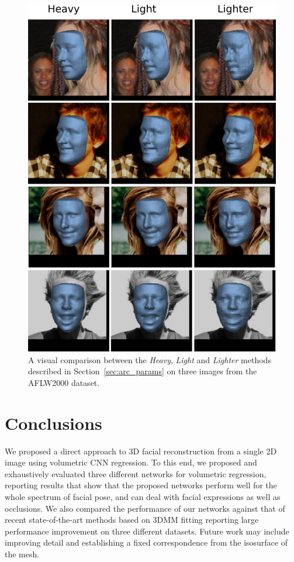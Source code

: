 \begin{figure}
  \centering
  \includegraphics[width=0.75\linewidth]{img/heavy-light-lighter.png}
  \caption[Visual comparison of number of parameters]{A visual
    comparison between the \textit{Heavy}, \textit{Light} and
    \textit{Lighter} methods described in Section~\ref{sec:arc_params}
    on three images from the AFLW2000 dataset.}
  \label{fig:heavy-light-lighter}
\end{figure}



\section{Conclusions}

We proposed a direct approach to 3D facial reconstruction from a
single 2D image using volumetric CNN regression. To this end, we
proposed and exhaustively evaluated three different networks for
volumetric regression, reporting results that show that the proposed
networks perform well for the whole spectrum of facial pose, and can
deal with facial expressions as well as occlusions. We also compared
the performance of our networks against that of recent
state-of-the-art methods based on 3DMM fitting reporting large
performance improvement on three different datasets.  Future work may
include improving detail and establishing a fixed correspondence from
the isosurface of the mesh.


